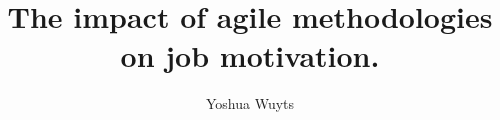 \documentclass[doc, 12pt, a4paper]{apa6}
\title{The impact of agile methodologies on job motivation.}
\author{Yoshua Wuyts}
\affiliation{Vrije Universiteit Amsterdam}
\begin{document}
\maketitle
\rmfamily

%
%





%
%


%
\end{document}
